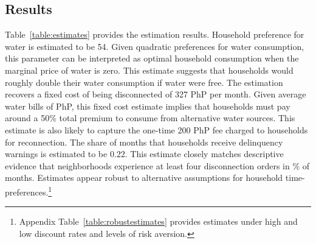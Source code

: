 \documentclass[12pt,table]{article}
\begin{document}
\subsection{Results}\label{section:results}    %

Table~\ref{table:estimates} provides the estimation results.  Household preference for water is estimated to be 54.  Given quadratic preferences for water consumption, this parameter can be interpreted as optimal household consumption when the marginal price of water is zero.  This estimate suggests that households would roughly double their water consumption if water were free.  The estimation recovers a fixed cost of being disconnected of 327 PhP per month.  Given average water bills of PhP, this fixed cost estimate implies that households must pay around a 50\% total premium to consume from alternative water sources.  This estimate is also likely to capture the one-time 200 PhP fee charged to households for reconnection.  The share of months that households receive delinquency warnings is estimated to be 0.22.  This estimate closely matches descriptive evidence that neighborhoods experience at least four disconnection orders in \unskip\% of months.  Estimates appear robust to alternative assumptions for household time-preferences.\footnote{Appendix Table~\ref{table:robustestimates} provides estimates under high and low discount rates and levels of risk aversion.}


\end{document}
